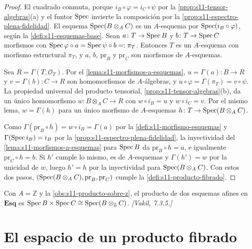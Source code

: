 \begin{proof}
El cuadrado conmuta, porque \(i_B\circ\varphi=i_C\circ\psi\) por la \cref{prop:s11-tensor-algebras}(a) y el funtor \(\operatorname{Spec}\) invierte la composición por la \cref{prop:s11-espectro-plena-fidelidad}. El esquema \(\operatorname{Spec}(B\otimes_A C)\) es un \(A\)-esquema por \(\operatorname{Spec}(i_B\circ\varphi)\), según la \cref{defi:s11-esquemas-base}. Sean \(a\colon T\to\operatorname{Spec} B\) y \(b\colon T\to\operatorname{Spec} C\) morfismos con \(\operatorname{Spec}\varphi\circ a=\operatorname{Spec}\psi\circ b=:\pi_T\). Entonces \(T\) es un \(A\)-esquema con morfismo estructural \(\pi_T\), y \(a\), \(b\), \(\mathrm{pr}_B\) y \(\mathrm{pr}_C\) son morfismos de \(A\)-esquemas.

Sea \(R=\Gamma(T,\mathcal O_T)\). Por el \cref{lema:s11-morfismos-a-esquemas}, \(u=\Gamma(a)\colon B\to R\) y \(v=\Gamma(b)\colon C\to R\) son homomorfismos de \(A\)-álgebras, y \(u\circ\varphi=\Gamma(\pi_T)=v\circ\psi\). La propiedad universal del producto tensorial, \cref{prop:s11-tensor-algebras}(b), da un único homomorfismo \(w\colon B\otimes_A C\to R\) con \(w\circ i_B=u\) y \(w\circ i_C=v\). Por el mismo lema, \(w=\Gamma(h)\) para un único morfismo de \(A\)-esquemas \(h\colon T\to\operatorname{Spec}(B\otimes_A C)\).

Como \(\Gamma(\mathrm{pr}_B\circ h)=w\circ i_B=\Gamma(a)\) por la \cref{defi:s11-morfismo-esquemas} y \(\Gamma(\operatorname{Spec} i_B)=i_B\) por la \cref{prop:s11-espectro-plena-fidelidad}, la inyectividad del \cref{lema:s11-morfismos-a-esquemas} para \(\operatorname{Spec} B\) da \(\mathrm{pr}_B\circ h=a\), e igualmente \(\mathrm{pr}_C\circ h=b\). Si \(h'\) cumple lo mismo, es de \(A\)-esquemas y \(\Gamma(h')=w\) por la unicidad de \(w\), luego \(h'=h\) por la inyectividad para \(\operatorname{Spec}(B\otimes_A C)\). Con estos dos pasos, \((\operatorname{Spec}(B\otimes_A C),\mathrm{pr}_B,\mathrm{pr}_C)\) cumple la \cref{defi:s11-producto-fibrado}.
\end{proof}

\begin{obs}
\label{obs:s11-caso-z-afines}
Con \(A=\mathbb Z\) y la \cref{obs:s11-producto-sobre-z}, el producto de dos esquemas afines en \(\mathbf{Esq}\) es \(\operatorname{Spec} B\times\operatorname{Spec} C\cong\operatorname{Spec}(B\otimes_{\mathbb Z}C)\). \emph{[Vakil, 7.3.5.]}
\end{obs}

\section{El espacio de un producto fibrado}
\label{sec:s11-espacio-producto}

